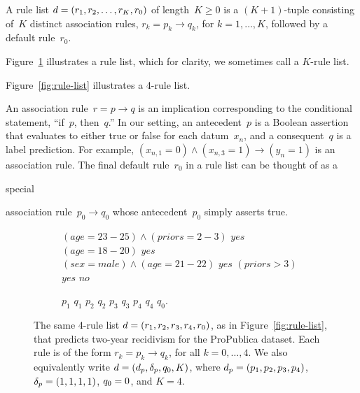A rule list ${{d} = (r_1, r_2, \dots, r_K, r_0)}$ of length~${K \ge 0}$
is a ${(K+1)}$-tuple consisting of~$K$ distinct association rules,
${r_k = p_k \rightarrow q_k}$, for ${k = 1, \dots, K}$,
followed by a default rule~$r_0$.
%
\begin{arxiv}
Figure~\ref{fig:rule-list-symbols} illustrates
a rule list, which for clarity, we sometimes call a $K$-rule list.
\end{arxiv}
\begin{kdd}
Figure~\ref{fig:rule-list} illustrates a 4-rule list.
\end{kdd}
%
An association rule~${r = p \rightarrow q}$ is an implication
corresponding to the conditional statement, ``if~$p$, then~$q$.''
%
In our setting, an antecedent~$p$ is a Boolean assertion that
evaluates to either true or false for each datum~$x_n$,
and a consequent~$q$ is a label prediction.
%
For example, ${(x_{n, 1} = 0) \wedge (x_{n, 3} = 1) \rightarrow (y_n = 1)}$
is an association rule.
%
%
The final default rule~$r_0$ in a rule list can be thought of
as a
\begin{arxiv}
special
\end{arxiv}
association rule~${p_0 \rightarrow q_0}$
whose antecedent~$p_0$ simply asserts true.

\begin{arxiv}
\begin{figure}[t!]
\begin{subfigure}{0.65\textwidth}
\begin{algorithmic}
\normalsize
\State \bif $(age=23-25) \wedge (priors=2-3)$ \bthen $yes$
\State \belif $(age=18-20)$ \bthen $yes$
\State \belif $(sex=male) \wedge (age=21-22)$ \bthen $yes$
\State \belif $(priors>3)$ \bthen $yes$
\State \belse $no$
\end{algorithmic}
\end{subfigure}
\begin{subfigure}{0.34\textwidth}
\begin{algorithmic}
\normalsize
\State \bif $p_1$ \bthen $q_1$
\State \belif $p_2$ \bthen $q_2$
\State \belif $p_3$ \bthen $q_3$
\State \belif $p_4$ \bthen $q_4$
\State \belse $q_0$.
\end{algorithmic}
\end{subfigure}
\caption{The same 4-rule list ${{d} = (r_1, r_2, r_3, r_4, r_0)}$,
as in Figure~\ref{fig:rule-list},
that predicts two-year recidivism for the ProPublica dataset.
Each rule is of the form ${r_k = p_k \rightarrow q_k}$,
for all ${k = 0, \dots, 4}$.
We also equivalently write ${{d} = (d_p, \delta_p, q_0, K)}$,
where ${d_p = (p_1, p_2, p_3, p_4)}$, ${\delta_p = (1, 1, 1, 1)}$,
${q_0 = 0}$, and ${K=4}$.
}
\label{fig:rule-list-symbols}
\end{figure}
\end{arxiv}

